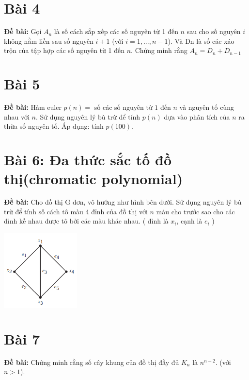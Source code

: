 \documentclass[12pt]{article}
\begin{document}
\begin{sloppypar}
\section{Bài 4}
\begin{tcolorbox}
    \textbf{Đề bài:}  Gọi \(A_{n}\) là số cách sắp xếp các số nguyên từ 1 đến \(n\) sau cho số nguyên \(i\) không nằm liền sau số nguyên \(i+1\) 
    (với \(i=1,...,n-1\)). Và Dn là số các xáo trộn của tập hợp các số nguyên từ 1 đến \(n\). Chứng minh rằng \(A_{n}= D_{n} + D_{n-1}\)
\end{tcolorbox}

\section{Bài 5}
\begin{tcolorbox}
    \textbf{Đề bài:} Hàm euler \(p(n)=\) số các số nguyên từ \(1\) đến \(n\) và nguyên tố cùng nhau với \(n\). Sử dụng nguyên lý bù trừ để tính \(p(n)\) dựa vào phân tích của \(n\) ra thừa số nguyên tố. Áp dụng: tính \(p(100)\).
\end{tcolorbox}

\section{Bài 6: Đa thức sắc tố đồ thị(chromatic polynomial)}
\begin{tcolorbox}
    \textbf{Đề bài:} Cho đồ thị G đơn, vô hướng như hình bên dưới.  Sử dụng nguyên lý bù trừ để tính số cách tô màu 4 đỉnh của đồ thị với  \(n\) màu cho trước sao cho các đỉnh kề nhau được tô bởi các màu khác nhau. ( đỉnh là \(x_{i}\), cạnh là \(e_{i}\) )
\end{tcolorbox}

\begin{center}
    {\includegraphics[width=4cm]{ex6.png}}
\end{center}

\section{Bài 7}
\begin{tcolorbox}
    \textbf{Đề bài:} Chứng minh rằng số cây khung của đồ thị đầy đủ \(K_{n}\) là \(n^{n-2}\).
    (với \(n > 1\)).
\end{tcolorbox}


\end{sloppypar}
\end{document}

